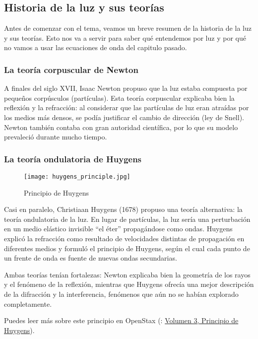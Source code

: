 \subsection{Historia de la luz y sus teorías}

Antes de comenzar con el tema, veamos un breve resumen de la historia de la luz y sus teorías. Esto nos va a servir para saber qué entendemos por luz y por qué no vamos a usar las ecuaciones de onda del capitulo pasado.

\subsubsection{La teoría corpuscular de Newton}

A finales del siglo XVII, Isaac Newton propuso que la luz estaba compuesta por pequeños corpúsculos (partículas). Esta teoría corpuscular explicaba bien la reflexión y la refracción: al considerar que las partículas de luz eran atraídas por los medios más densos, se podía justificar el cambio de dirección (ley de Snell). Newton también contaba con gran autoridad científica, por lo que su modelo prevaleció durante mucho tiempo.

\subsubsection{La teoría ondulatoria de Huygens}

\begin{wrapfigure}{r}{0.25\textwidth}
  \centering
  \texttt{[image: huygens\_principle.jpg]}
  \caption{Principio de Huygens}
  \label{fig:huygens_principle}
\end{wrapfigure}
Casi en paralelo, Christiaan Huygens (1678) propuso una teoría alternativa: la teoría ondulatoria de la luz. En lugar de partículas, la luz sería una perturbación en un medio elástico invisible ``el éter'' propagándose como ondas. Huygens explicó la refracción como resultado de velocidades distintas de propagación en diferentes medios y formuló el principio de Huygens, según el cual cada punto de un frente de onda es fuente de nuevas ondas secundarias.

Ambas teorías tenían fortalezas: Newton explicaba bien la geometría de los rayos y el fenómeno de la reflexión, mientras que Huygens ofrecía una mejor descripción de la difracción y la interferencia, fenómenos que aún no se habían explorado completamente.

Puedes leer más sobre este principio en OpenStax (\cite{openstax}: \href{https://openstax.org/books/f%C3%ADsica-universitaria-volumen-3/pages/1-6-principio-de-huygens}{Volumen 3, Principio de Huygens}).

